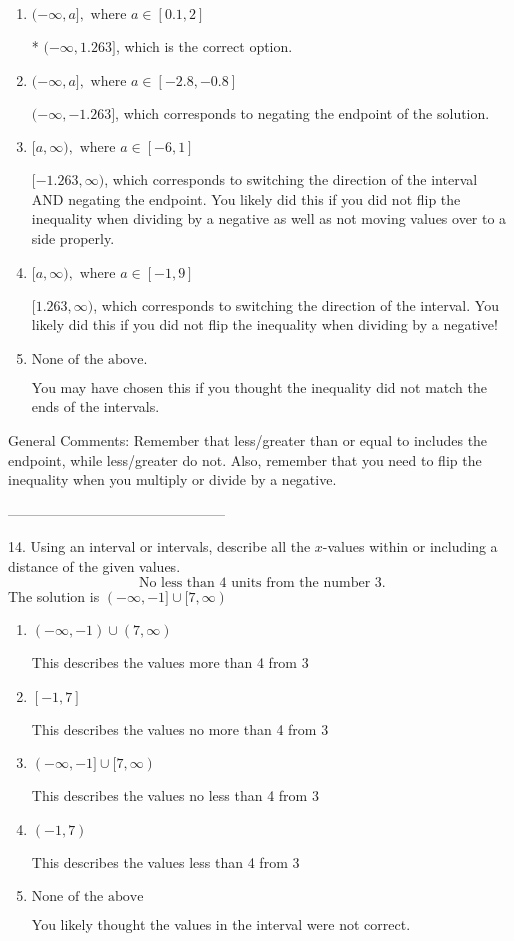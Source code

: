 \documentclass{article}[14pt]
\begin{document}
\begin{enumerate}[label=\Alph*.] 
\item $ (-\infty, a], \text{ where } a \in [0.1, 2] $ 

 * $(-\infty, 1.263]$, which is the correct option. 
\item $ (-\infty, a], \text{ where } a \in [-2.8, -0.8] $ 

  $(-\infty, -1.263]$, which corresponds to negating the endpoint of the solution. 
\item $ [a, \infty), \text{ where } a \in [-6, 1] $ 

  $[-1.263, \infty)$, which corresponds to switching the direction of the interval AND negating the endpoint. You likely did this if you did not flip the inequality when dividing by a negative as well as not moving values over to a side properly. 
\item $ [a, \infty), \text{ where } a \in [-1, 9] $ 

  $[1.263, \infty)$, which corresponds to switching the direction of the interval. You likely did this if you did not flip the inequality when dividing by a negative! 
\item $ \text{None of the above}. $ 

 You may have chosen this if you thought the inequality did not match the ends of the intervals. 
\end{enumerate} 
 
General Comments: Remember that less/greater than or equal to includes the endpoint, while less/greater do not. Also, remember that you need to flip the inequality when you multiply or divide by a negative.

-----------------------------------------------

14. Using an interval or intervals, describe all the $x$-values within or including a distance of the given values.
$$ \text{ No less than } 4 \text{ units from the number } 3. $$ 
The solution is $ (-\infty, -1] \cup [7, \infty) $ 

\begin{enumerate}[label=\Alph*.] 
\item $ (-\infty, -1) \cup (7, \infty) $ 

 This describes the values more than 4 from 3 
\item $ [-1, 7] $ 

 This describes the values no more than 4 from 3 
\item $ (-\infty, -1] \cup [7, \infty) $ 

 This describes the values no less than 4 from 3 
\item $ (-1, 7) $ 

 This describes the values less than 4 from 3 
\item $ \text{None of the above} $ 

 You likely thought the values in the interval were not correct. 
\end{enumerate} 
 
\end{document}
